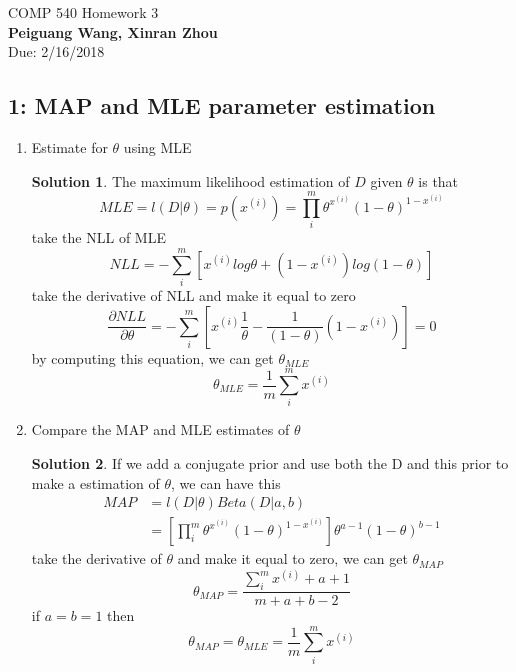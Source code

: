 \documentclass[]{book}
\theoremstyle{definition}
\newtheorem*{soln}{Solution}
\begin{document}
\begin{center}
{\Large COMP 540 \hspace{0.5cm} Homework 3}\\
\textbf{Peiguang Wang, Xinran Zhou}\\ %
Due: 2/16/2018 %
\end{center}

\vspace{0.2 cm}


\subsection*{1: MAP and MLE parameter estimation }

\begin{enumerate}
	\item Estimate for $\theta$ using MLE
	\begin{soln}
		The maximum likelihood estimation of $D$ given $\theta$ is that
		$$MLE = l(D|\theta) = p(x^{(i)}) = \prod_{i}^{m} \theta^{x^{(i)}} (1-\theta)^{1-x^{(i)}}$$
		take the NLL of MLE
		$$NLL = -\sum_{i}^{m}[x^{(i)} log \theta +(1-x^{(i)})log (1 - \theta)]$$
		take the derivative of NLL and make it equal to zero
		$$\frac{\partial NLL }{\partial \theta } = -\sum_{i}^{m}[ x^{(i)} \frac{1}{\theta} - \frac{1}{(1-\theta)}(1- x^{(i)})] = 0$$
		by computing this equation, we can get $\theta_{MLE}$
		$$\theta_{MLE} = \frac{1}{m} \sum_{i}^{m} x^{(i)}$$
		
	\end{soln}
	\item Compare the MAP and MLE estimates of $\theta$
	\begin{soln}
		If we add a conjugate prior and use both the D and this prior to make a estimation of $\theta$, we can have this
		\begin{equation*}
			\begin{split}
			MAP &=l(D|\theta)Beta(D|a,b)\\
				&=[\prod_{i}^{m} \theta^{x^{(i)}}(1-\theta)^{1-x^{(i)}}]\theta^{a-1}(1-\theta)^{b -1}
			\end{split}
		\end{equation*}
		take the derivative of $\theta$ and make it equal to zero, we can get $\theta_{MAP}$
		$$\theta_{MAP} = \frac{\sum_{i}^{m}x^{(i) }+ a + 1}{ m + a + b - 2}$$
		if $a = b= 1$ then 
		$$\theta_{MAP} = \theta_{MLE}=\frac{1}{m}\sum_{i}^{m} x^{(i)}$$
	\end{soln}

\end{enumerate}
\end{document}
